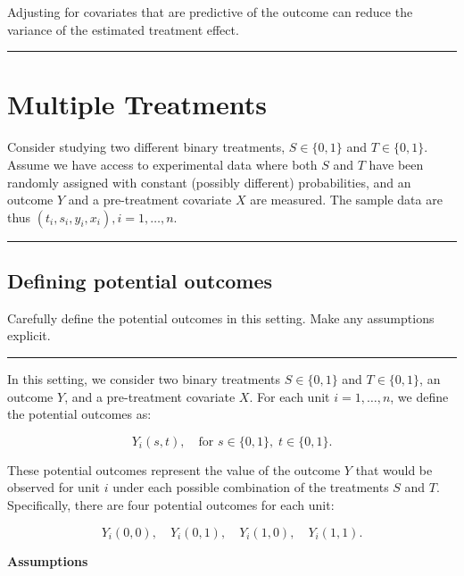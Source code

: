 \documentclass{article}
\newenvironment{colorparagraph}[1]{\par\color{#1}}{\par}
\begin{document}
Adjusting for covariates that are predictive of the outcome can reduce the variance of the estimated treatment effect.

\newpage

\begin{colorparagraph}{questioncolor}
\rule{\textwidth}{0.5pt}

\label{q3}\section{Multiple Treatments}

Consider studying two different binary treatments, \(S \in \{0,1\}\) and \(T \in \{0,1\}\). Assume we have access to experimental data where both \(S\) and \(T\) have been randomly assigned with constant (possibly different) probabilities, and an outcome \(Y\) and a pre-treatment covariate \(X\) are measured. The sample data are thus \((t_i, s_i, y_i, x_i), i = 1, \dots, n\).
\end{colorparagraph}

\begin{colorparagraph}{questioncolor}
\rule{\textwidth}{0.5pt}

\label{q3a}\subsection{Defining potential outcomes}
Carefully define the potential outcomes in this setting. Make any assumptions explicit.

\rule{\textwidth}{0.5pt}
\end{colorparagraph}

In this setting, we consider two binary treatments \(S \in \{0,1\}\) and \(T \in \{0,1\}\), an outcome \(Y\), and a pre-treatment covariate \(X\). For each unit \(i = 1, \dots, n\), we define the potential outcomes as:

\[
Y_i(s, t), \quad \text{for } s \in \{0,1\}, \; t \in \{0,1\}.
\]

These potential outcomes represent the value of the outcome \(Y\) that would be observed for unit \(i\) under each possible combination of the treatments \(S\) and \(T\). Specifically, there are four potential outcomes for each unit:

\[
Y_i(0,0), \quad Y_i(0,1), \quad Y_i(1,0), \quad Y_i(1,1).
\]

\textbf{Assumptions}
\end{document}
